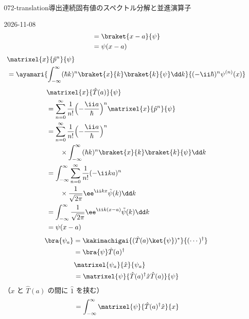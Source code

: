 \documentclass[uplatex,dvipdfmx,a4paper,11pt]{jsarticle}
\begin{document}
\begin{mondai}{072-translation}{導出}{連続固有値のスペクトル分解と並進演算子}
\begin{kotaeutsushi}{2026-11-08}
\begin{align*}
&=\braket{x-a}{\psi}\\
&=\psi(x-a)
\end{align*}
\begin{align*}
&\matrixel{x}{\hat{p}^{n}}{\psi}\\
&=\ayamari{\int_{-\infty}^{\infty}(\hbar k)^{n}\braket{x}{k}\braket{k}{\psi}\dd k}{(-\ii\hbar)^{n}\psi^{(n)}(x)}
\end{align*}
\begin{align*}
&\matrixel{x}{\hat{T}(a)}{\psi}\\
&=\sum_{n=0}^{\infty}\frac{1}{n!}\Bigl(-\frac{\ii a}{\hbar}\Bigr)^{n}\matrixel{x}{\hat{p}^{n}}{\psi}\\
&=\sum_{n=0}^{\infty}\frac{1}{n!}\Bigl(-\frac{\ii a}{\hbar}\Bigr)^{n}\\
&\qquad\times\int_{-\infty}^{\infty}(\hbar k)^{n}\braket{x}{k}\braket{k}{\psi}\dd k\\
&=\int_{-\infty}^{\infty}\sum_{n=0}^{\infty}\frac{1}{n!}(-\ii ka)^{n}\\
&\qquad\times\frac{1}{\sqrt{2\pi}}\ee^{\ii kx}\tilde{\psi}(k)\dd k\\
&=\int_{-\infty}^{\infty}\frac{1}{\sqrt{2\pi}}\ee^{\ii k(x-a)}\tilde{\psi}(k)\dd k\\
&=\psi(x-a)
\end{align*}
\begin{align*}
\bra{\psi_{a}}&=\kakimachigai{(\hat{T}(a)\ket{\psi})^{*}}{(\cdots)^{\dagger}}\\
&=\bra{\psi}\hat{T}(a)^{\dagger}
\end{align*}
\begin{align*}
&\matrixel{\psi_{a}}{\hat{x}}{\psi_{a}}\\
&=\matrixel{\psi}{\hat{T}(a)^{\dagger}\hat{x}\hat{T}(a)}{\psi}
\end{align*}
（$\hat{x}$ と $\hat{T}(a)$ の間に $\hat{1}$ を挟む）
\begin{align*}
&=\int_{-\infty}^{\infty}\matrixel{\psi}{\hat{T}(a)^{\dagger}\hat{x}}{x}\\

\end{align*}
\end{kotaeutsushi}
\end{mondai}
\end{document}
